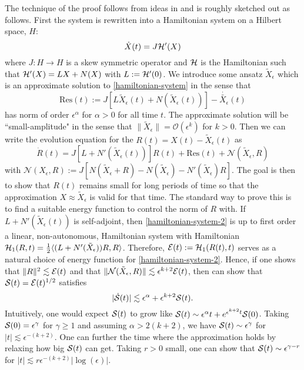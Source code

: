 The technique of the proof follows from ideas in \cite{schneider2000counter,khan2017long} and is roughly sketched out as follows. First the system is rewritten into a Hamiltonian system on a Hilbert space, \(H\):
\begin{equation}\label{hamiltonian-system}
	\dot X(t) = J \mathcal{H}'(X)
\end{equation}
where \(J:H\to H\) is a skew symmetric operator and \(\mathcal{H}\) is the Hamiltonian such that \(\mathcal{H}'(X) = LX + N(X)\) with \(L:= \mathcal{H}'(0)\). We introduce some ansatz \(\tilde X_\epsilon\) which is an approximate solution to \cref{hamiltonian-system} in the sense that 
\begin{equation*}
	\mathrm{Res}(t) := J[L\tilde X_\epsilon(t)  + N(\tilde X_\epsilon(t))] - \dot{\tilde {X_\epsilon}}(t) 
\end{equation*}
has norm of order \(\epsilon^\alpha\) for \(\alpha > 0\)  for all time \(t\). The approximate solution will be ``small-amplitude" in the sense that \(\| \tilde X_\epsilon \| = \mathcal O(\epsilon^k)\) for \(k > 0 \). Then we can write the evolution equation for the \(R(t) = X(t) - \tilde X_\epsilon(t)\) as 
\begin{equation}\label{hamiltonian-system-2}
	\dot R(t) = J[L + N'(\tilde X_\epsilon(t))]R(t) + \mathrm{Res}(t) + \mathcal N(\tilde X_\epsilon, R)
\end{equation}
with \(\mathcal N( X_\epsilon, R) := J[N(\tilde X_\epsilon +R) - N(\tilde X_\epsilon) - N'(\tilde X_\epsilon)R]\). The goal is then to show that \(R(t)\) remains small for long periods of time so that the approximation \(X \approx \tilde X_\epsilon\) is valid for that time. The standard way to prove this is to find a suitable energy function to control the norm of \(R\) with. If \(L + N'(\tilde X_\epsilon(t))\) is self-adjoint, then \cref{hamiltonian-system-2} is up to first order a linear, non-autonomous, Hamiltonian system with Hamiltonian \(\mathcal{H}_1(R, t) = \frac 1 2 \langle (L+N'(\tilde X_\epsilon)) R, R\rangle\). Therefore, \(\mathcal{E}(t) := \mathcal{H}_1(R(t),t)\) serves as a natural choice of energy function for \cref{hamiltonian-system-2}. Hence, if one shows that \( \| R\|^2\lesssim\mathcal{E}(t)\) and that  \(\|\mathcal N(\tilde X_\epsilon, R) \| \lesssim \epsilon^{k+2} \mathcal{E}(t)\), then can show that \(\mathcal{S}(t) = \mathcal{E}(t)^{1/2}\) satisfies
\begin{equation*}
	|\dot {\mathcal{S}} (t) | \lesssim \epsilon^{\alpha} + \epsilon^{k+2}\mathcal{S}(t).
\end{equation*}
Intuitively, one would expect \(\mathcal{S}(t)\) to grow like \(\mathcal{S}(t) \sim \epsilon^\alpha t + e^{\epsilon^{k+2} t} \mathcal{S}(0)\). Taking \(\mathcal{S}(0) =\epsilon^\gamma\) for \(\gamma \geq 1\) and assuming \(\alpha > 2(k+2)\), we have \(\mathcal{S}(t) \sim \epsilon^\gamma \) for \(|t|\lesssim \epsilon^{-(k+2)}\). One can further the time where the approximation holds by relaxing how big \(\mathcal{S}(t)\) can get. Taking \(r>0\) small, one can show that \(\mathcal{S}(t) \sim \epsilon^{\gamma - r}\) for \(|t| \lesssim r \epsilon^{-(k+2)}|\log(\epsilon)|\).

